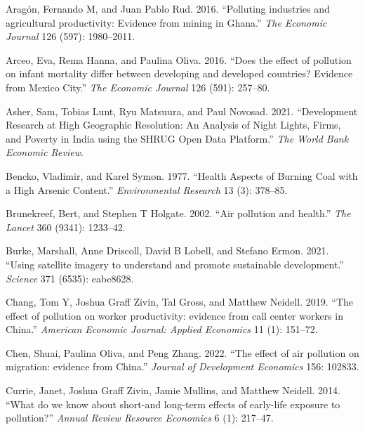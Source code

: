 \documentclass[
]{article}
\newlength{\cslhangindent}
\newlength{\cslentryspacingunit} %
\newenvironment{CSLReferences}[2] %
 {%
  \setlength{\parindent}{0pt}
  \ifodd #1
  \let\oldpar\par
  \def\par{\hangindent=\cslhangindent\oldpar}
  \fi
  \setlength{\parskip}{#2\cslentryspacingunit}
 }%
 {}
\begin{document}
\hypertarget{refs}{}
\begin{CSLReferences}{1}{0}
\leavevmode{}%
Aragón, Fernando M, and Juan Pablo Rud. 2016. {``{Polluting industries and agricultural productivity: Evidence from mining in Ghana}.''} \emph{{The Economic Journal}} 126 (597): 1980--2011.

\leavevmode{}%
Arceo, Eva, Rema Hanna, and Paulina Oliva. 2016. {``{Does the effect of pollution on infant mortality differ between developing and developed countries? Evidence from Mexico City}.''} \emph{{The Economic Journal}} 126 (591): 257--80.

\leavevmode{}%
Asher, Sam, Tobias Lunt, Ryu Matsuura, and Paul Novosad. 2021. {``{Development Research at High Geographic Resolution: An Analysis of Night Lights, Firms, and Poverty in India using the SHRUG Open Data Platform}.''} \emph{{The World Bank Economic Review}}.

\leavevmode{}%
Bencko, Vladimir, and Karel Symon. 1977. {``Health Aspects of Burning Coal with a High Arsenic Content.''} \emph{{Environmental Research}} 13 (3): 378--85.

\leavevmode{}%
Brunekreef, Bert, and Stephen T Holgate. 2002. {``{Air pollution and health}.''} \emph{{The Lancet}} 360 (9341): 1233--42.

\leavevmode{}%
Burke, Marshall, Anne Driscoll, David B Lobell, and Stefano Ermon. 2021. {``{Using satellite imagery to understand and promote sustainable development}.''} \emph{Science} 371 (6535): eabe8628.

\leavevmode{}%
Chang, Tom Y, Joshua Graff Zivin, Tal Gross, and Matthew Neidell. 2019. {``{The effect of pollution on worker productivity: evidence from call center workers in China}.''} \emph{{American Economic Journal: Applied Economics}} 11 (1): 151--72.

\leavevmode{}%
Chen, Shuai, Paulina Oliva, and Peng Zhang. 2022. {``{The effect of air pollution on migration: evidence from China}.''} \emph{{Journal of Development Economics}} 156: 102833.

\leavevmode{}%
Currie, Janet, Joshua Graff Zivin, Jamie Mullins, and Matthew Neidell. 2014. {``{What do we know about short-and long-term effects of early-life exposure to pollution?}''} \emph{{Annual Review Resource Economics}} 6 (1): 217--47.


\end{CSLReferences}
\end{document}
